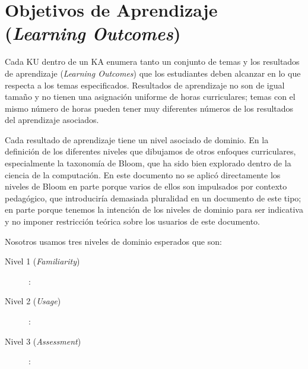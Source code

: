 \section{Objetivos de Aprendizaje ({\it Learning Outcomes})}
Cada KU dentro de un KA enumera tanto un conjunto de temas y los resultados de aprendizaje ({\it Learning Outcomes})
que los estudiantes deben alcanzar en lo que respecta a los temas especificados. 
Resultados de aprendizaje no son de igual tamaño y no tienen una asignación uniforme de horas curriculares; 
temas con el mismo número de horas pueden tener muy diferentes números de los resultados del aprendizaje asociados.

Cada resultado de aprendizaje tiene un nivel asociado de dominio. 
En la definición de los diferentes niveles que dibujamos de otros enfoques curriculares, 
especialmente la taxonomía de Bloom, que ha sido bien explorado dentro de la ciencia de la computación. 
En este documento no se aplicó directamente los niveles de Bloom en parte porque varios de 
ellos son impulsados por contexto pedagógico, que introduciría demasiada pluralidad en un documento de este tipo; 
en parte porque tenemos la intención de los niveles de dominio para ser indicativa y 
no imponer restricción teórica sobre los usuarios de este documento.

Nosotros usamos tres niveles de dominio esperados que son:
\begin{description}
 \item [Nivel 1 \Familiarity ({\it Familiarity})]: \LearningOutcomesTxtEsFamiliarity
 \item [Nivel 2 \Usage ({\it Usage})]: \LearningOutcomesTxtEsUsage
 \item [Nivel 3 \Assessment ({\it Assessment})]: \LearningOutcomesTxtEsAssessment
\end{description}


